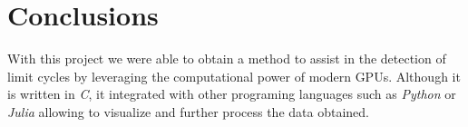 
\section{Conclusions}%
\label{sec:conclusions}

With this project we were able to obtain a method to assist in the detection of
limit cycles by leveraging the computational power of modern GPUs. Although it is
written in \emph{C}, it integrated with other programing languages such as
\emph{Python} or \emph{Julia} allowing to visualize and further process the data
obtained.
